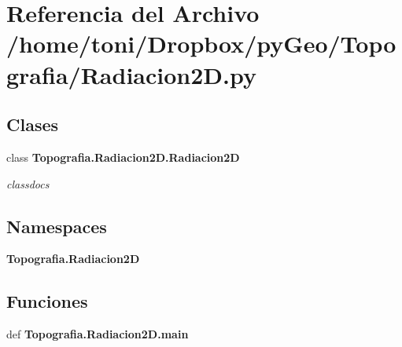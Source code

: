 \section{Referencia del Archivo /home/toni/\-Dropbox/py\-Geo/\-Topografia/\-Radiacion2\-D.py}
\label{Radiacion2D_8py}
\subsection*{Clases}
\begin{DoxyCompactItemize}
\item 
class {\bf Topografia.\-Radiacion2\-D.\-Radiacion2\-D}
\begin{DoxyCompactList}\small\item\em classdocs \end{DoxyCompactList}\end{DoxyCompactItemize}
\subsection*{Namespaces}
\begin{DoxyCompactItemize}
\item 
{\bf Topografia.\-Radiacion2\-D}
\end{DoxyCompactItemize}
\subsection*{Funciones}
\begin{DoxyCompactItemize}
\item 
def {\bf Topografia.\-Radiacion2\-D.\-main}
\end{DoxyCompactItemize}

